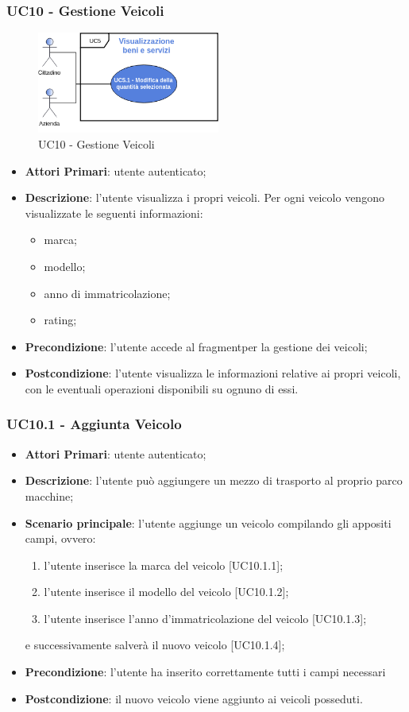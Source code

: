  \subsubsection{UC10 - Gestione Veicoli}
  \begin{figure}[H]
 	\includegraphics[width=6cm]{res/images/UC5-Generale.png}
 	\centering
 	\caption{UC10 - Gestione Veicoli}
 \end{figure}
 \begin{itemize}
 	\item \textbf{Attori Primari}: utente autenticato;
 	\item \textbf{Descrizione}: l'utente visualizza i propri veicoli. Per ogni veicolo vengono visualizzate le seguenti informazioni:
 	\begin{itemize}
 		\item marca;
 		\item modello;
 		\item anno di immatricolazione;
 		\item rating;
 	\end{itemize}
 	\item \textbf{Precondizione}: l'utente accede al fragment\glosp per la gestione dei veicoli;
 	\item \textbf{Postcondizione}: l'utente visualizza le informazioni relative ai propri veicoli, con le eventuali operazioni disponibili su ognuno di essi.
 \end{itemize}
 \subsubsection{UC10.1 - Aggiunta Veicolo}
 \begin{itemize}
 	\item \textbf{Attori Primari}: utente autenticato;
 	\item \textbf{Descrizione}: l'utente può aggiungere un mezzo di trasporto al proprio parco macchine;
 	\item \textbf{Scenario principale}: l'utente aggiunge un veicolo compilando gli appositi campi, ovvero:
 	\begin{enumerate}
 		\item l'utente inserisce la marca del veicolo [UC10.1.1];
 		\item l'utente inserisce il modello del veicolo [UC10.1.2];
 		\item l'utente inserisce l'anno d'immatricolazione del veicolo [UC10.1.3];
 	\end{enumerate}
 	e successivamente salverà il nuovo veicolo [UC10.1.4];
 	\item \textbf{Precondizione}: l'utente ha inserito correttamente tutti i campi necessari
 	\item \textbf{Postcondizione}: il nuovo veicolo viene aggiunto ai veicoli posseduti.
 \end{itemize}

